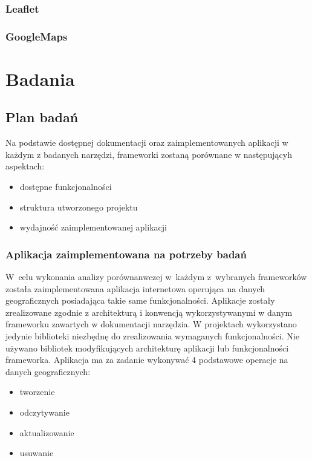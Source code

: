 \documentclass[printmode]{mgr}
\begin{document}
\subsection{Leaflet}
\subsection{GoogleMaps}



\chapter{Badania}

\section{Plan badań}

Na podstawie dostępnej dokumentacji oraz zaimplementowanych aplikacji w każdym z badanych narzędzi, frameworki zostaną porównane w następującyh aspektach:
\begin{itemize}
  \item dostępne funkcjonalności
  \item struktura utworzonego projektu
  \item wydajność zaimplementowanej aplikacji
\end{itemize}


\subsection{Aplikacja zaimplementowana na potrzeby badań}

W~celu wykonania analizy porównanwczej w~każdym z~wybranych frameworków została zaimplementowana aplikacja internetowa operująca na danych geograficznych posiadająca takie same funkcjonalności. Aplikacje zostały zrealizowane zgodnie z architekturą i konwencją wykorzystywanymi w danym frameworku zawartych w dokumentacji narzędzia. W projektach wykorzystano jedynie biblioteki niezbędnę do zrealizowania wymaganych funkcjonalności. Nie używano bibliotek modyfikujących architekturę aplikacji lub funkcjonalności frameworka.
Aplikacja ma za zadanie wykonywać 4 podstawowe operacje na danych geograficznych:
\begin{itemize}
  \item tworzenie
  \item odczytywanie
  \item aktualizowanie
  \item usuwanie
\end{itemize}
\end{document}
